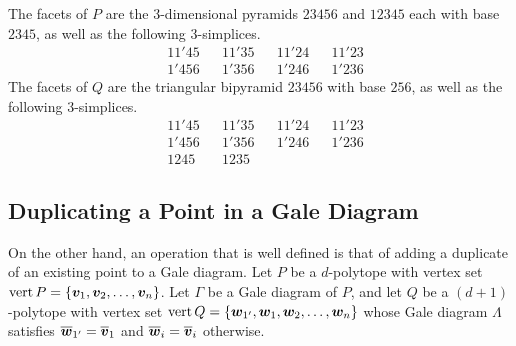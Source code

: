         The facets of \(P\) are the \(3\)-dimensional pyramids \(23456\) and \(12345\) each with base \(2345\), as well as the following \(3\)-simplices.
            \begin{align*}
                &11'45&     &11'35&     &11'24&     &11'23\\
                &1'456&     &1'356&     &1'246&     &1'236
            \end{align*}
        The facets of \(Q\) are the triangular bipyramid \(23456\) with base \(256\), as well as the following \(3\)-simplices.
            \begin{align*}
                &11'45&     &11'35&     &11'24&     &11'23\\
                &1'456&     &1'356&     &1'246&     &1'236\\
                &1245&      &1235&      &&&
            \end{align*}
    \subsection{Duplicating a Point in a Gale Diagram}
        On the other hand, an operation that is well defined is that of adding a duplicate of an existing point to a Gale diagram.
        Let \(P\) be a \(d\)-polytope with vertex set \(\operatorname{vert} P=\left\{\bm{v}_1,\bm{v}_2,\dotsc,\bm{v}_n\right\}\).  Let \(\Gamma\) be a Gale diagram of \(P\), and let \(Q\) be a \((d+1)\)-polytope with vertex set \(\operatorname{vert} Q=\left\{\bm{w}_{1'},\bm{w}_1,\bm{w}_2,\dotsc,\bm{w}_n\right\}\) whose Gale diagram \(\Lambda\) satisfies \(\overline{\bm{w}}_{1'}=\overline{\bm{v}}_1\) and \(\overline{\bm{w}}_i=\overline{\bm{v}}_i\) otherwise.

